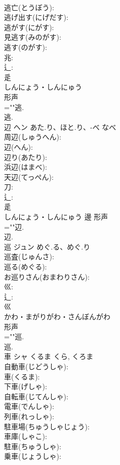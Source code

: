 \documentclass[8pt]{extreport}
\begin{document}
\begin{CJK}{UTF8}{min}
\\	逃亡(とうぼう): 
\\	逃げ出す(にげだす): 
\\	逃がす(にがす): 
\\	見逃す(みのがす): 
\\	逃す(のがす): 
\\	兆: 
\\	辶: 
\\	辵	
\\	しんにょう・しんにゅう	
\\	形声 
\\	=""逃.
\\	逃.
\\	辺	ヘン	あた.り、ほと.り、-べ	なべ	
\\	周辺(しゅうへん): 
\\	辺(へん): 
\\	辺り(あたり): 
\\	浜辺(はまべ): 
\\	天辺(てっぺん): 
\\	刀: 
\\	辶: 
\\	辵	
\\	しんにょう・しんにゅう	邊	形声 
\\	=""辺.
\\	辺.
\\	巡	ジュン	めぐ.る、めぐ.り		
\\	巡査(じゅんさ): 
\\	巡る(めぐる): 
\\	お巡りさん(おまわりさん): 
\\	巛: 
\\	辶: 
\\	巛	
\\	かわ・まがりがわ・さんぼんがわ	
\\	形声 
\\	=""巡.
\\	巡.
\\	車	シャ	くるま	くら, くろま	
\\	自動車(じどうしゃ): 
\\	車(くるま): 
\\	下車(げしゃ): 
\\	自転車(じてんしゃ): 
\\	電車(でんしゃ): 
\\	列車(れっしゃ): 
\\	駐車場(ちゅうしゃじょう): 
\\	車庫(しゃこ): 
\\	駐車(ちゅうしゃ): 
\\	乗車(じょうしゃ): 

\end{CJK}
\end{document}

